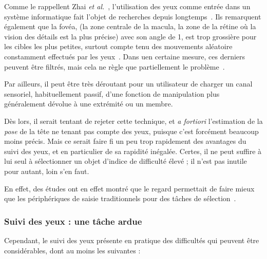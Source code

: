	Comme le rappellent Zhai \emph{et al.}~\cite{zhai1999manual}, l'utilisation des yeux comme entrée dans un système informatique fait l'objet de recherches depuis longtemps~\cite{levine1981eye, bolt1982eyes, ware1987evaluation, jacob1990you}. Ils remarquent également que la fovéa, (la zone centrale de la macula, la zone de la rétine où la vision des détails est la plus précise) avec son angle de 1\textdegree{}, est trop grossière pour les cibles les plus petites, surtout compte tenu des mouvements aléatoire constamment effectués par les yeux~\cite{monden2005evaluation, vspakov2011comparison}. Dans uen certaine mesure, ces derniers peuvent être filtrés, mais cela ne règle que partiellement le problème~\cite{zhang2008improving}.
	
	Par ailleurs, il peut être très déroutant pour un utilisateur de \og charger \fg{} un canal sensoriel, habituellement passif\footnotemark{}, d'une fonction de manipulation plus généralement dévolue à une extrémité ou un membre.
	
	
	Dès lors, il serait tentant de rejeter cette technique, et \emph{a fortiori} l'estimation de la \emph{pose} de la tête ne tenant pas compte des yeux, puisque c'est forcément beaucoup moins précis. Mais ce serait faire fi un peu trop rapidement des avantages du suivi des yeux, et en particulier de sa rapidité inégalée. Certes, il ne peut suffire à lui seul à sélectionner un objet d'indice de difficulté élevé ; il n'est pas inutile pour autant, loin s'en faut.

	En effet, des études ont en effet montré que le regard permettait de faire mieux que les périphériques de saisie traditionnels pour des tâches de sélection~\cite{stellmach2012look, ware1987evaluation, smith2000hand, bieg2010eye}.
	
	\subsubsection{Suivi des yeux : une tâche ardue}

	Cependant, le suivi des yeux présente en pratique des difficultés qui peuvent être considérables, dont au moins les suivantes :
	

